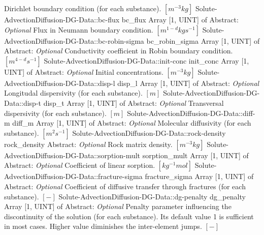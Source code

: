 \begin{RecordType}
			{{{Dirichlet boundary condition (for each substance). }{$[m^{-3}kg]$}}}
		\RecKey
			{Solute-AdvectionDiffusion-DG-Data::bc-flux}
			{bc{\_}flux}
			{{Array [1, UINT] of }{Abstract}{: }}
			{ \it{Optional} }
			{{{Flux in Neumann boundary condition. }{$[m^{1-d}kgs^{-1}]$}}}
		\RecKey
			{Solute-AdvectionDiffusion-DG-Data::bc-robin-sigma}
			{bc{\_}robin{\_}sigma}
			{{Array [1, UINT] of }{Abstract}{: }}
			{ \it{Optional} }
			{{{Conductivity coefficient in Robin boundary condition. }{$[m^{4-d}s^{-1}]$}}}
		\RecKey
			{Solute-AdvectionDiffusion-DG-Data::init-conc}
			{init{\_}conc}
			{{Array [1, UINT] of }{Abstract}{: }}
			{ \it{Optional} }
			{{{Initial concentrations. }{$[m^{-3}kg]$}}}
		\RecKey
			{Solute-AdvectionDiffusion-DG-Data::disp-l}
			{disp{\_}l}
			{{Array [1, UINT] of }{Abstract}{: }}
			{ \it{Optional} }
			{{{Longitudal dispersivity (for each substance). }{$[m]$}}}
		\RecKey
			{Solute-AdvectionDiffusion-DG-Data::disp-t}
			{disp{\_}t}
			{{Array [1, UINT] of }{Abstract}{: }}
			{ \it{Optional} }
			{{{Transversal dispersivity (for each substance). }{$[m]$}}}
		\RecKey
			{Solute-AdvectionDiffusion-DG-Data::diff-m}
			{diff{\_}m}
			{{Array [1, UINT] of }{Abstract}{: }}
			{ \it{Optional} }
			{{{Molecular diffusivity (for each substance). }{$[m^{2}s^{-1}]$}}}
		\RecKey
			{Solute-AdvectionDiffusion-DG-Data::rock-density}
			{rock{\_}density}
			{{Abstract}{: }}
			{ \it{Optional} }
			{{{Rock matrix density. }{$[m^{-3}kg]$}}}
		\RecKey
			{Solute-AdvectionDiffusion-DG-Data::sorption-mult}
			{sorption{\_}mult}
			{{Array [1, UINT] of }{Abstract}{: }}
			{ \it{Optional} }
			{{{Coefficient of linear sorption. }{$[kg^{-1}mol]$}}}
		\RecKey
			{Solute-AdvectionDiffusion-DG-Data::fracture-sigma}
			{fracture{\_}sigma}
			{{Array [1, UINT] of }{Abstract}{: }}
			{ \it{Optional} }
			{{{Coefficient of diffusive transfer through fractures (for each substance). }{$[-]$}}}
		\RecKey
			{Solute-AdvectionDiffusion-DG-Data::dg-penalty}
			{dg{\_}penalty}
			{{Array [1, UINT] of }{Abstract}{: }}
			{ \it{Optional} }
			{{{Penalty parameter influencing the discontinuity of the solution (for each substance). Its default value 1 is sufficient in most cases. Higher value diminishes the inter-element jumps. }{$[-]$}}}
\end{RecordType}
